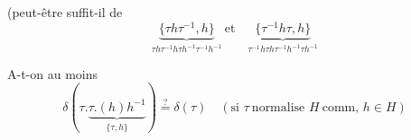 (peut-être suffit-il de
\[
 \underbrace{\{\tau h\tau^{-1},h\}}_{\tau h\tau^{-1}h\tau h^{-1}\tau^{-1}h^{-1}}
 \ \text{et}\quad
 \underbrace{\{\tau^{-1}h\tau,h\}}_{\tau^{-1}h\tau h\tau^{-1}h^{-1}\tau h^{-1}}
\]

A-t-on au moins
\[
 \boxed{\delta(\tau.\underbrace{\tau.(h)h^{-1}}_{\{\tau,h\}})\overset{?}{=}\delta(\tau)}
 \quad(\text{si }\tau\ \text{normalise }H\ \text{comm, }h\in H)
\]

